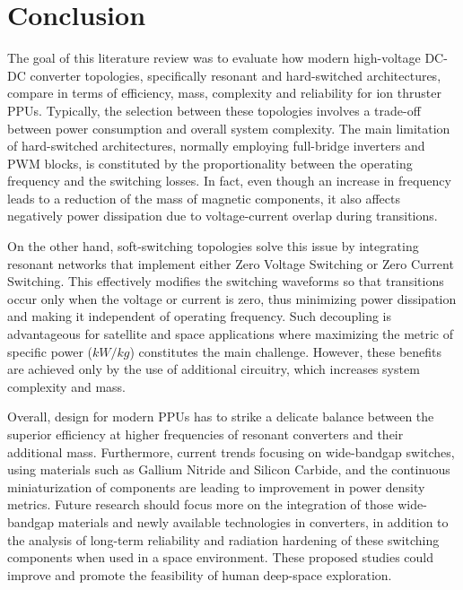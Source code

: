 \section{Conclusion}
The goal of this literature review was to evaluate how modern high-voltage DC-DC converter topologies, specifically resonant and hard-switched architectures, compare in terms of efficiency, mass, complexity and reliability for ion thruster PPUs. Typically, the selection between these topologies involves a trade-off between power consumption and overall system complexity. The main limitation of hard-switched architectures, normally employing full-bridge inverters and PWM blocks, is constituted by the proportionality between the operating frequency and the switching losses. In fact, even though an increase in frequency leads to a reduction of the mass of magnetic components, it also affects negatively power dissipation due to voltage-current overlap during transitions.

On the other hand, soft-switching topologies solve this issue by integrating resonant networks that implement either Zero Voltage Switching or Zero Current Switching. This effectively modifies the switching waveforms so that transitions occur only when the voltage or current is zero, thus minimizing power dissipation and making it independent of operating frequency. Such decoupling is advantageous for satellite and space applications where maximizing the metric of specific power ($kW/kg$) constitutes the main challenge. However, these benefits are achieved only by the use of additional circuitry, which increases system complexity and mass.

Overall, design for modern PPUs has to strike a delicate balance between the superior efficiency at higher frequencies of resonant converters and their additional mass. Furthermore, current trends focusing on wide-bandgap switches, using materials such as Gallium Nitride and Silicon Carbide, and the continuous miniaturization of components are leading to improvement in power density metrics. Future research should focus more on the integration of those wide-bandgap materials and newly available technologies in converters, in addition to the analysis of long-term reliability and radiation hardening of these switching components when used in a space environment. These proposed studies could improve and promote the feasibility of human deep-space exploration.